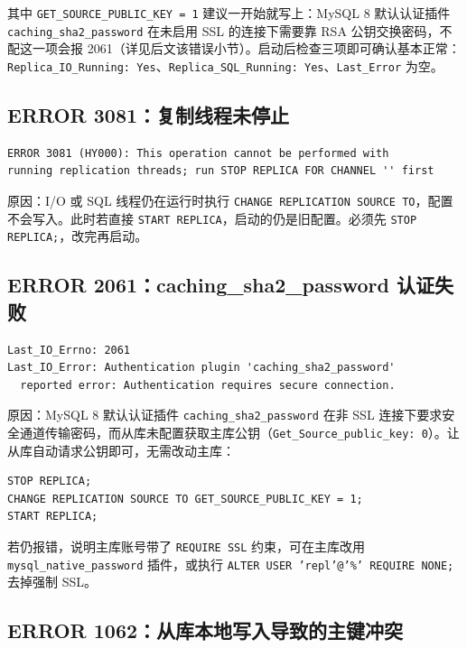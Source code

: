 \documentclass[12pt,UTF8]{ctexbook}
\begin{document}
其中 \texttt{GET\_SOURCE\_PUBLIC\_KEY = 1} 建议一开始就写上：MySQL 8 默认认证插件 \texttt{caching\_sha2\_password} 在未启用 SSL 的连接下需要靠 RSA 公钥交换密码，不配这一项会报 2061（详见后文该错误小节）。启动后检查三项即可确认基本正常：\texttt{Replica\_IO\_Running: Yes}、\texttt{Replica\_SQL\_Running: Yes}、\texttt{Last\_Error} 为空。

\subsection{ERROR 3081：复制线程未停止}

\begin{lstlisting}
ERROR 3081 (HY000): This operation cannot be performed with
running replication threads; run STOP REPLICA FOR CHANNEL '' first
\end{lstlisting}

原因：I/O 或 SQL 线程仍在运行时执行 \texttt{CHANGE REPLICATION SOURCE TO}，配置不会写入。此时若直接 \texttt{START REPLICA}，启动的仍是旧配置。必须先 \texttt{STOP REPLICA;}，改完再启动。

\subsection{ERROR 2061：caching\_sha2\_password 认证失败}

\begin{lstlisting}
Last_IO_Errno: 2061
Last_IO_Error: Authentication plugin 'caching_sha2_password'
  reported error: Authentication requires secure connection.
\end{lstlisting}

原因：MySQL 8 默认认证插件 \texttt{caching\_sha2\_password} 在非 SSL 连接下要求安全通道传输密码，而从库未配置获取主库公钥（\texttt{Get\_Source\_public\_key: 0}）。让从库自动请求公钥即可，无需改动主库：

\begin{lstlisting}
STOP REPLICA;
CHANGE REPLICATION SOURCE TO GET_SOURCE_PUBLIC_KEY = 1;
START REPLICA;
\end{lstlisting}

若仍报错，说明主库账号带了 \texttt{REQUIRE SSL} 约束，可在主库改用 \texttt{mysql\_native\_password} 插件，或执行 \texttt{ALTER USER 'repl'@'\%' REQUIRE NONE;} 去掉强制 SSL。

\subsection{ERROR 1062：从库本地写入导致的主键冲突}
\end{document}
